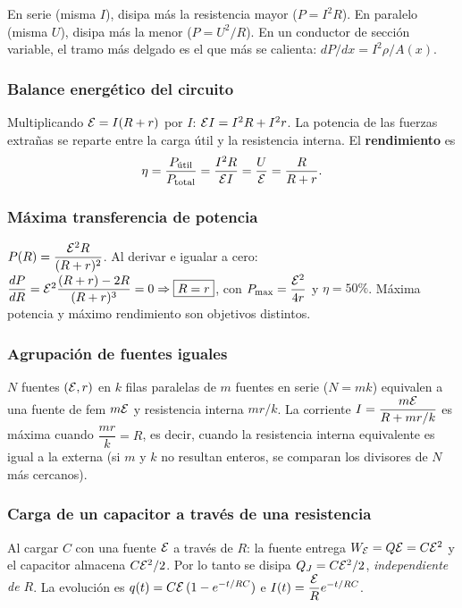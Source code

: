 \documentclass[11pt]{article}
\begin{document}
\begin{idea}
En serie (misma $I$), disipa más la resistencia mayor ($P=I^2R$). En paralelo (misma $U$), disipa más la menor ($P=U^2/R$). En un conductor de sección variable, el tramo más delgado es el que más se calienta: $dP/dx=I^2\rho/A(x)$.
\end{idea}

\subsubsection*{Balance energético del circuito}
Multiplicando $\mathcal{E}=I(R+r)$ por $I$: $\mathcal{E} I=I^2R+I^2r$. La potencia de las fuerzas extrañas se reparte entre la carga útil y la resistencia interna. El \textbf{rendimiento} es
\[
\eta=\frac{P_{\text{útil}}}{P_{\text{total}}}=\frac{I^2R}{\mathcal{E} I}=\frac{U}{\mathcal{E}}=\frac{R}{R+r}.
\]

\subsubsection*{Máxima transferencia de potencia}
$P(R)=\dfrac{\mathcal{E}^2R}{(R+r)^2}$. Al derivar e igualar a cero: $\dfrac{dP}{dR}=\mathcal{E}^2\dfrac{(R+r)-2R}{(R+r)^3}=0\Rightarrow\boxed{R=r}$, con $P_{\max}=\dfrac{\mathcal{E}^2}{4r}$ y $\eta=50\%$. Máxima potencia y máximo rendimiento son objetivos distintos.

\subsubsection*{Agrupación de fuentes iguales}
$N$ fuentes $(\mathcal{E},r)$ en $k$ filas paralelas de $m$ fuentes en serie ($N=mk$) equivalen a una fuente de fem $m\mathcal{E}$ y resistencia interna $mr/k$. La corriente $I=\dfrac{m\mathcal{E}}{R+mr/k}$ es máxima cuando $\dfrac{mr}{k}=R$, es decir, cuando la resistencia interna equivalente es igual a la externa (si $m$ y $k$ no resultan enteros, se comparan los divisores de $N$ más cercanos).

\subsubsection*{Carga de un capacitor a través de una resistencia}
Al cargar $C$ con una fuente $\mathcal{E}$ a través de $R$: la fuente entrega $W_{\mathcal{E}}=Q\mathcal{E}=C\mathcal{E}^2$ y el capacitor almacena $C\mathcal{E}^2/2$. Por lo tanto se disipa $Q_J=C\mathcal{E}^2/2$, \emph{independiente de $R$}. La evolución es $q(t)=C\mathcal{E}\,(1-e^{-t/RC})$ e $I(t)=\dfrac{\mathcal{E}}{R}e^{-t/RC}$.
\end{document}
